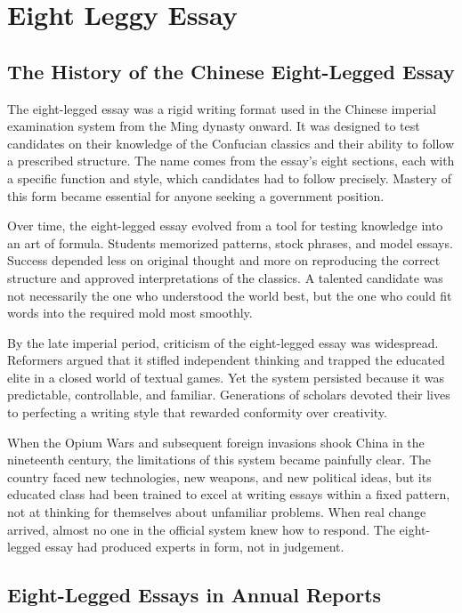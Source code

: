 \chapter{Eight Leggy Essay}

\section{The History of the Chinese Eight-Legged Essay}

The eight-legged essay was a rigid writing format used in the Chinese imperial examination system from the Ming dynasty onward. It was designed to test candidates on their knowledge of the Confucian classics and their ability to follow a prescribed structure. The name comes from the essay's eight sections, each with a specific function and style, which candidates had to follow precisely. Mastery of this form became essential for anyone seeking a government position.

Over time, the eight-legged essay evolved from a tool for testing knowledge into an art of formula. Students memorized patterns, stock phrases, and model essays. Success depended less on original thought and more on reproducing the correct structure and approved interpretations of the classics. A talented candidate was not necessarily the one who understood the world best, but the one who could fit words into the required mold most smoothly.

By the late imperial period, criticism of the eight-legged essay was widespread. Reformers argued that it stifled independent thinking and trapped the educated elite in a closed world of textual games. Yet the system persisted because it was predictable, controllable, and familiar. Generations of scholars devoted their lives to perfecting a writing style that rewarded conformity over creativity.

When the Opium Wars and subsequent foreign invasions shook China in the nineteenth century, the limitations of this system became painfully clear. The country faced new technologies, new weapons, and new political ideas, but its educated class had been trained to excel at writing essays within a fixed pattern, not at thinking for themselves about unfamiliar problems. When real change arrived, almost no one in the official system knew how to respond. The eight-legged essay had produced experts in form, not in judgement.

\section{Eight-Legged Essays in Annual Reports}

